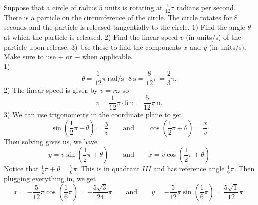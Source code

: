 Suppose that a circle of radius $5$ units is rotating at $\frac{1}{12}\pi$ radians per second. There is a particle on the circumference of the circle. The circle rotates for $8$ seconds and the particle is released tangentially to the circle. 1) Find the angle $\theta$ at which the particle is released. 2) Find the linear speed $v$ (in units/s) of the particle upon release. 3) Use these to find the components $x$ and $y$ (in units/s). Make sure to use $+$ or $-$ when applicable.
\[\]
1)
$$
\theta = \frac{1}{12}\pi\ \text{rad}/\text{s} \cdot 8\ \text{s} = \frac{8}{12}\pi = \frac{2}{3}\pi.
$$
2) The linear speed is given by $v = r\omega$ so
$$
  v = \frac{1}{12}\pi \cdot 5\ \text{u} = \frac{5}{12}\pi\ \text{u}.
$$
3) We can use trigonometry in the coordinate plane to get
$$
  \sin\left(\frac{1}{2}\pi + \theta\right) = \frac{y}{v} \qquad \text{and} \qquad \cos\left(\frac{1}{2}\pi + \theta\right) = \frac{x}{v}
$$
Then solving gives us, we have
$$
  y = v\sin\left(\frac{1}{2}\pi + \theta\right) \qquad \text{and} \qquad x = v\cos\left(\frac{1}{2}\pi + \theta\right)
$$
Notice that $\frac{1}{2}\pi + \theta = \frac{7}{6}\pi$. This is in quadrant $III$ and has reference angle $\frac{1}{6}\pi$. Then plugging everything in, we get
$$
  x = -\frac{5}{12}\pi \cos\left(\frac{1}{6}\pi\right) = -\frac{5\sqrt{3}}{24}\pi \qquad \text{and} \qquad y = -\frac{5}{12}\pi \sin\left(\frac{1}{6}\pi\right) = \frac{5\sqrt{1}}{12}\pi.
$$
